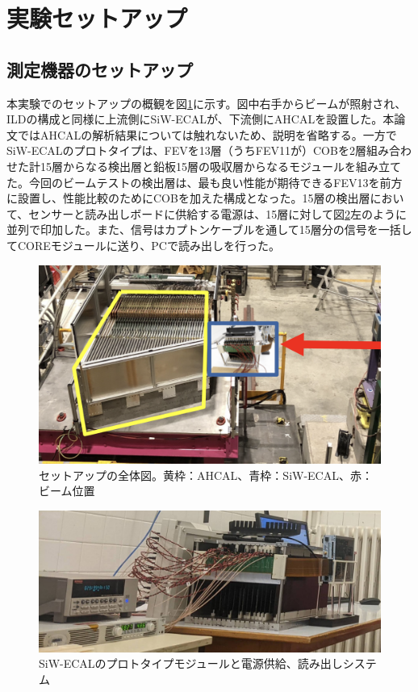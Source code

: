 \section{実験セットアップ}
\subsection{測定機器のセットアップ}
本実験でのセットアップの概観を図\ref{setup1}に示す。図中右手からビームが照射され、ILDの構成と同様に上流側にSiW-ECALが、下流側にAHCALを設置した。本論文ではAHCALの解析結果については触れないため、説明を省略する。一方でSiW-ECALのプロトタイプは、FEVを13層（うちFEV11が）COBを2層組み合わせた計15層からなる検出層と鉛板15層の吸収層からなるモジュールを組み立てた。今回のビームテストの検出層は、最も良い性能が期待できるFEV13を前方に設置し、性能比較のためにCOBを加えた構成となった。15層の検出層において、センサーと読み出しボードに供給する電源は、15層に対して図\ref{setup2}左のように並列で印加した。また、信号はカプトンケーブルを通して15層分の信号を一括してCOREモジュールに送り、PCで読み出しを行った。\\
\begin{figure}[H]
\begin{center}
 \includegraphics[keepaspectratio, scale=0.3]
 	{Figure/Beamtest/setup1.png}
 		\caption{セットアップの全体図。黄枠：AHCAL、青枠：SiW-ECAL、赤：ビーム位置}
		\label{setup1}
		\end{center}
\end{figure}

\begin{figure}[H]
\begin{center}
 \includegraphics[keepaspectratio, scale=0.2]
 	{Figure/Beamtest/setup2.png}
 		\caption{SiW-ECALのプロトタイプモジュールと電源供給、読み出しシステム}
		\label{setup2}
\end{center}
\end{figure}

